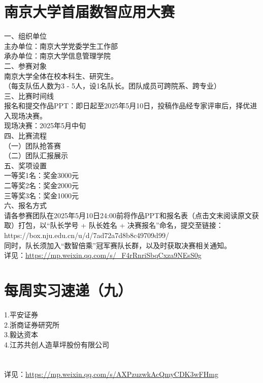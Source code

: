 \documentclass[letterpaper, 12pt]{article}
\begin{document}
\begin{multicols}{2}
\section{南京大学首届数智应用大赛} %
一、组织单位
\\主办单位：南京大学党委学生工作部
\\承办单位：南京大学信息管理学院
\\二、参赛对象
\\南京大学全体在校本科生、研究生。
\\（每支队伍人数为3 - 5人，设1名队长。团队成员可跨院系、跨专业）
\\三、比赛时间线
\\报名和提交作品PPT：即日起至2025年5月10日，投稿作品经专家评审后，择优进入现场决赛。
\\现场决赛：2025年5月中旬
\\四、比赛流程
\\（一）团队抢答赛
\\（二）团队汇报展示
\\五、奖项设置
\\一等奖1名：奖金3000元
\\二等奖2名：奖金2000元
\\三等奖3名：奖金1000元
\\六、报名方式
\\请各参赛团队在2025年5月10日24:00前将作品PPT和报名表（点击文末阅读原文获取）打包，以“队长学号 + 队长姓名 + 决赛报名”命名，提交至链接：https://box.nju.edu.cn/u/d/7ad72a7d8b8c49709d99/
\\同时，队长须加入“数智倍乘”冠军赛队长群，以及时获取决赛相关通知。
\\详见：\url{https://mp.weixin.qq.com/s/_F4rRnriSbqCxza9NEsS0g}

\section{ 每周实习速递（九）} %
1.平安证券
\\2.浙商证券研究所
\\3.毅达资本
\\4.江苏共创人造草坪股份有限公司
\\
\\
\\详见：\url{https://mp.weixin.qq.com/s/AXPzuzwkAcQmyCDK3wFHmg}


\end{multicols}
\end{document}
